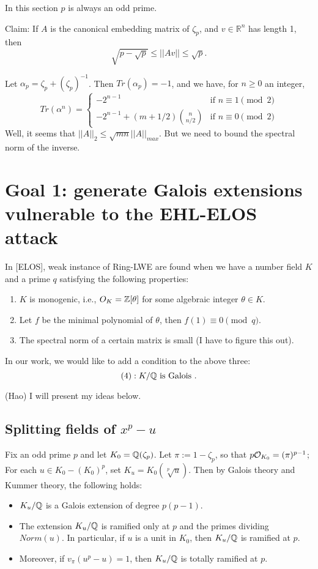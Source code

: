 \documentclass{amsart}
\begin{document}
In this section $p$ is always an odd prime.

Claim: If $A$ is the canonical embedding matrix of $\zeta_p$, and $v \in \mathbb{R}^n$ has length 1, then
\[
          \sqrt{p-\sqrt{p}}  \leq  ||Av|| \leq \sqrt{p}.
\]

Let $\alpha_p = \zeta_p + (\zeta_p)^{-1}$. Then $Tr(\alpha_p) = -1$, and we have, for $n \geq 0$ an integer,
\[
Tr(\alpha^n) =
\begin{cases} -2^{n-1} & \mbox{if } n \equiv 1 \pmod{2}\\
-2^{n-1} + (m+1/2) {n \choose n/2} &   \mbox{if } n \equiv 0 \pmod{2}
\end{cases}
\]
Well, it seems that $||A||_2 \leq \sqrt{mn} ||A||_{max}$. But we need to bound the spectral norm of the inverse.



\section{Goal 1: generate Galois extensions vulnerable to the EHL-ELOS attack}

In [ELOS], weak instance of Ring-LWE are found when we have a number field $K$ and a prime $q$ satisfying the following properties:

\begin{enumerate}
\item $K$ is monogenic, i.e., $O_K = \mathbb{Z}[\theta]$ for some
algebraic integer $\theta \in K$.
\item Let $f$ be the minimal polynomial of $\theta$, then
$f(1) \equiv 0 \pmod{q}$.
\item The spectral norm of a certain matrix is small (I have to figure this out).
\end{enumerate}

In our work, we would like to add a condition to the above three:
\[
(4): K/\mathbb{Q} \mbox{ is Galois }.
\]

(Hao) I will present my ideas below.
\subsection{Splitting fields of $x^p - u$}

Fix an odd prime $p$ and let $K_0 = \mathbb{Q}(\zeta_p)$. Let $\pi := 1-\zeta_p$, so that $p\mathcal{O}_{K_0} = (\pi)^{p-1}$; For each $u \in K_0 -(K_0)^p$, set $K_u = K_0(\sqrt[p]{u})$.  Then by Galois theory and Kummer theory, the following holds:
\begin{itemize}
\item $K_u/\mathbb{Q}$ is a Galois extension of degree $p(p-1)$.
\item The extension $K_u/\mathbb{Q}$ is ramified only at $p$ and the primes dividing $Norm(u)$. In particular, if $u$ is a unit in $K_0$, then $K_u/\mathbb{Q}$ is ramified at $p$.
\item Moreover, if $v_\pi(u^p - u) = 1$, then $K_u/\mathbb{Q}$ is totally ramified at $p$.
\end{itemize}
\end{document}
